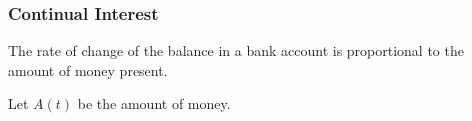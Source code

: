 \begin{frame}
  \frametitle{Continual Interest}

  The rate of change of the balance in a bank account is proportional
  to the amount of money present.

  Let $A(t)$ be the amount of money.


\end{frame}



